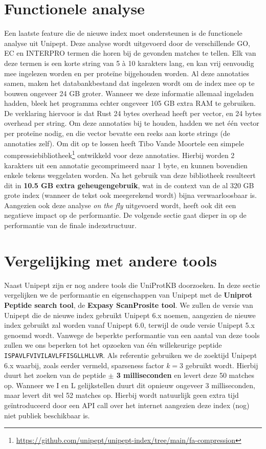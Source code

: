 \section{Functionele analyse}\label{sec:functionele-analyse}
Een laatste feature die de nieuwe index moet ondersteunen is de functionele analyse uit Unipept.
Deze analyse wordt uitgevoerd door de verschillende GO, EC en INTERPRO termen die horen bij de gevonden matches te tellen.
Elk van deze termen is een korte string van 5 à 10 karakters lang, en kan vrij eenvoudig mee ingelezen worden en per proteïne bijgehouden worden.
Al deze annotaties samen, maken het databankbestand dat ingelezen wordt om de index mee op te bouwen ongeveer 24 GB groter.
Wanneer we deze informatie allemaal ingeladen hadden, bleek het programma echter ongeveer 105 GB extra RAM te gebruiken.
De verklaring hiervoor is dat Rust 24 bytes overhead heeft per vector, en 24 bytes overhead per string.
Om deze annotaties bij te houden, hadden we net één vector per proteïne nodig, en die vector bevatte een reeks aan korte strings (de annotaties zelf).
Om dit op te lossen heeft Tibo Vande Moortele een simpele compressiebibliotheek\footnote{\url{https://github.com/unipept/unipept-index/tree/main/fa-compression}} ontwikkeld voor deze annotaties.
Hierbij worden 2 karakters uit een annotatie gecomprimeerd naar 1 byte, en kunnen bovendien enkele tekens weggelaten worden.
Na het gebruik van deze bibliotheek resulteert dit in \textbf{10.5 GB extra geheugengebruik}, wat in de context van de al 320 GB grote index (wanneer de tekst ook meegerekend wordt) bijna verwaarloosbaar is.
Aangezien ook deze analyse \textit{on the fly} uitgevoerd wordt, heeft ook dit een negatieve impact op de performantie.
De volgende sectie gaat dieper in op de performantie van de finale indexstructuur.

\section{Vergelijking met andere tools}\label{subsec:vergelijking-met-andere-tools}
Naast Unipept zijn er nog andere tools die UniProtKB doorzoeken.
In deze sectie vergelijken we de performantie en eigenschappen van Unipept met de \textbf{Uniprot Peptide search tool}, de \textbf{Expasy ScanProsite tool}.
We zullen de versie van Unipept die de nieuwe index gebruikt Unipept 6.x noemen, aangezien de nieuwe index gebruikt zal worden vanaf Unipept 6.0, terwijl de oude versie Unipept 5.x genoemd wordt.
Vanwege de beperkte performantie van een aantal van deze tools zullen we ons beperken tot het opzoeken van één willekeurige peptide \texttt{ISPAVLFVIVILAVLFFISGLLHLLVR}.
Als referentie gebruiken we de zoektijd Unipept 6.x waarbij, zoals eerder vermeld, sparseness factor $k = 3$ gebruikt wordt.
Hierbij duurt het zoeken van de peptide \textbf{$\pm$ 3 milliseconden} en levert deze 50 matches op.
Wanneer we I en L gelijkstellen duurt dit opnieuw ongeveer 3 milliseconden, maar levert dit wel 52 matches op.
Hierbij wordt natuurlijk geen extra tijd geïntroduceerd door een API call over het internet aangezien deze index (nog) niet publiek beschikbaar is.

